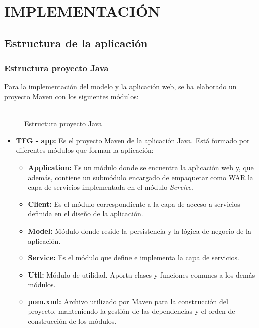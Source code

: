 \chapter[Implementación]{
  \label{chp:implementacion}
  IMPLEMENTACIÓN
}
\thispagestyle{numberingStyle}
\pagestyle{numberingStyle}



\section{Estructura de la aplicación}
\subsection{Estructura proyecto Java}
Para la implementación del modelo y la aplicación web, se ha elaborado un proyecto Maven con los siguientes módulos:
\\
\\

\begin{figure}[H]
\centering
{}
\caption{Estructura proyecto Java}
\end{figure}


\begin{itemize}
	\item \textbf{TFG - app: } Es el proyecto Maven de la aplicación Java. Está formado por diferentes módulos que forman la aplicación:
	\begin{itemize}
		\item \textbf{Application: }Es un módulo donde se encuentra la aplicación web y, que además, contiene un submódulo encargado de empaquetar como WAR la capa de servicios implementada en el módulo \textit{Service}.
		\item \textbf{Client: }Es el módulo correspondiente a la capa de acceso a servicios definida en el diseño de la aplicación. 
		\item \textbf{Model: } Módulo donde reside la persistencia y la lógica de negocio de la aplicación.
		\item \textbf{Service: }Es el módulo que define e implementa la capa de servicios.
		\item \textbf{Util: } Módulo de utilidad. Aporta clases y funciones comunes a los demás módulos.
		\item \textbf{pom.xml: }Archivo utilizado por Maven para la construcción del proyecto, manteniendo la gestión de las dependencias y el orden de construcción de los módulos.
	\end{itemize}
\end{itemize}

